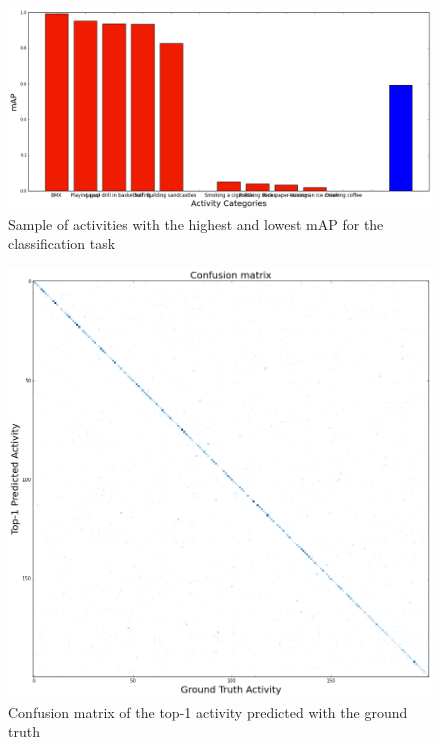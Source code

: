 \begin{figure}[H]
\begin{center}
\includegraphics[width=1\linewidth]{img/results/high_low_map_classification}
\end{center}
\caption{Sample of activities with the highest and lowest mAP for the classification task}
\label{fig:map_by_activity_classification}
\end{figure}

\begin{figure}[H]
\begin{center}
\includegraphics[width=1\linewidth]{img/results/confussion_matrix}
\end{center}
\caption{Confusion matrix of the top-1 activity predicted with the ground truth}
\label{fig:confussion_matrix}
\end{figure}

